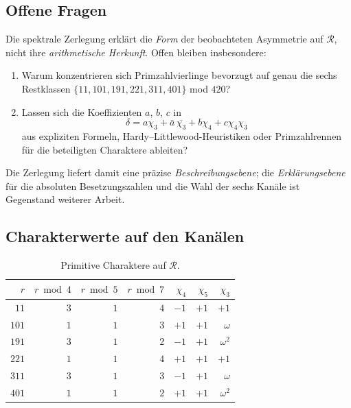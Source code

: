 \subsection{Offene Fragen}

Die spektrale Zerlegung erklärt die \emph{Form} der beobachteten Asymmetrie
auf $\mathcal{R}$, nicht ihre \emph{arithmetische Herkunft}.
Offen bleiben insbesondere:
\begin{enumerate}
  \item Warum konzentrieren sich Primzahlvierlinge bevorzugt auf
        genau die sechs Restklassen $\{11,101,191,221,311,401\}$ mod $420$?
  \item Lassen sich die Koeffizienten $a$, $b$, $c$ in
        \[
          \delta = a\chi_3 + \bar{a}\,\overline{\chi_3}
                   + b\chi_4 + c\chi_4\chi_3
        \]
        aus expliziten Formeln, Hardy--Littlewood-Heuristiken oder
        Primzahlrennen für die beteiligten Charaktere ableiten?
\end{enumerate}
Die Zerlegung liefert damit eine präzise \emph{Beschreibungsebene};
die \emph{Erklärungsebene} für die absoluten Besetzungszahlen und
die Wahl der sechs Kanäle ist Gegenstand weiterer Arbeit.

\subsection{Charakterwerte auf den Kanälen}

\begin{table}[ht]
\centering
\caption{Primitive Charaktere auf $\mathcal{R}$.}
\label{tab:char-values}
\begin{tabular}{rrrrrrr}
\toprule
$r$ & $r\bmod 4$ & $r\bmod 5$ & $r\bmod 7$ & $\chi_4$ & $\chi_5$ & $\chi_3$ \\
\midrule
$11$  & $3$ & $1$ & $4$ & $-1$ & $+1$ & $+1$ \\
$101$ & $1$ & $1$ & $3$ & $+1$ & $+1$ & $\omega$ \\
$191$ & $3$ & $1$ & $2$ & $-1$ & $+1$ & $\omega^2$ \\
$221$ & $1$ & $1$ & $4$ & $+1$ & $+1$ & $+1$ \\
$311$ & $3$ & $1$ & $3$ & $-1$ & $+1$ & $\omega$ \\
$401$ & $1$ & $1$ & $2$ & $+1$ & $+1$ & $\omega^2$ \\
\bottomrule
\end{tabular}
\end{table}

